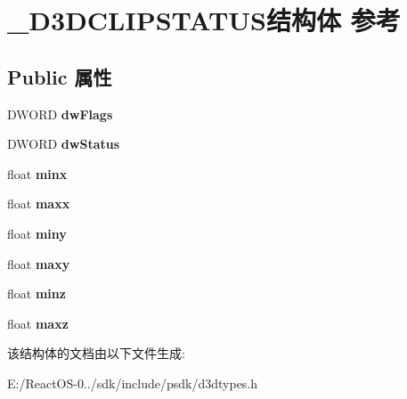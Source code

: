 \hypertarget{struct___d3_d_c_l_i_p_s_t_a_t_u_s}{}\section{\+\_\+\+D3\+D\+C\+L\+I\+P\+S\+T\+A\+T\+U\+S结构体 参考}
\label{struct___d3_d_c_l_i_p_s_t_a_t_u_s}
\subsection*{Public 属性}
\begin{DoxyCompactItemize}
\item 
\mbox{\label{struct___d3_d_c_l_i_p_s_t_a_t_u_s_a706774e48d1d9761496423dfa13867d2}} 
D\+W\+O\+RD {\bfseries dw\+Flags}
\item 
\mbox{\label{struct___d3_d_c_l_i_p_s_t_a_t_u_s_a7a0a4c46cf9bb09ff42dd4ad27aa6273}} 
D\+W\+O\+RD {\bfseries dw\+Status}
\item 
\mbox{\label{struct___d3_d_c_l_i_p_s_t_a_t_u_s_aff2089e3b832bb77088f5b846d56e97b}} 
float {\bfseries minx}
\item 
\mbox{\label{struct___d3_d_c_l_i_p_s_t_a_t_u_s_aa76f89b4c0153c5e7d00e23cb563c53b}} 
float {\bfseries maxx}
\item 
\mbox{\label{struct___d3_d_c_l_i_p_s_t_a_t_u_s_a4748967fdafcfc5def827499006ee157}} 
float {\bfseries miny}
\item 
\mbox{\label{struct___d3_d_c_l_i_p_s_t_a_t_u_s_afc114033f7db1c9013b9f27955b8624e}} 
float {\bfseries maxy}
\item 
\mbox{\label{struct___d3_d_c_l_i_p_s_t_a_t_u_s_a36cdced04423f5a144c256e0c3656560}} 
float {\bfseries minz}
\item 
\mbox{\label{struct___d3_d_c_l_i_p_s_t_a_t_u_s_a61798349e63ceea42fc87c6dfd667aa4}} 
float {\bfseries maxz}
\end{DoxyCompactItemize}


该结构体的文档由以下文件生成\+:\begin{DoxyCompactItemize}
\item 
E\+:/\+React\+O\+S-\/0../sdk/include/psdk/d3dtypes.\+h\end{DoxyCompactItemize}
